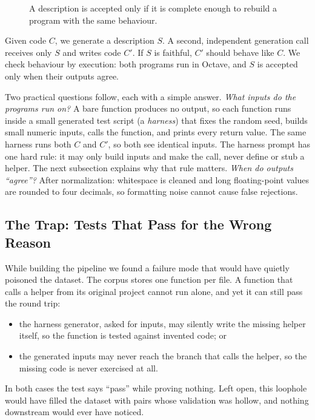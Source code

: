 \documentclass[conference]{IEEEtran}
\begin{document}
\begin{figure}[t]
\centering
{}
\caption{A description is accepted only if it is complete enough to rebuild a program with the same behaviour.}
\label{fig:pipeline-desc}
\end{figure}

Given code $C$, we generate a description $S$. A second, independent generation call receives only $S$ and writes code $C'$. If $S$ is faithful, $C'$ should behave like $C$. We check behaviour by execution: both programs run in Octave, and $S$ is accepted only when their outputs agree.

Two practical questions follow, each with a simple answer. \emph{What inputs do the programs run on?} A bare function produces no output, so each function runs inside a small generated test script (a \emph{harness}) that fixes the random seed, builds small numeric inputs, calls the function, and prints every return value. The same harness runs both $C$ and $C'$, so both see identical inputs. The harness prompt has one hard rule: it may only build inputs and make the call, never define or stub a helper. The next subsection explains why that rule matters. \emph{When do outputs ``agree''?} After normalization: whitespace is cleaned and long floating-point values are rounded to four decimals, so formatting noise cannot cause false rejections.

\subsection{The Trap: Tests That Pass for the Wrong Reason}
\label{sec:resolvability}
While building the pipeline we found a failure mode that would have quietly poisoned the dataset. The corpus stores one function per file. A function that calls a helper from its original project cannot run alone, and yet it can still pass the round trip:
\begin{itemize}
  \item the harness generator, asked for inputs, may silently write the missing helper itself, so the function is tested against invented code; or
  \item the generated inputs may never reach the branch that calls the helper, so the missing code is never exercised at all.
\end{itemize}
In both cases the test says ``pass'' while proving nothing. Left open, this loophole would have filled the dataset with pairs whose validation was hollow, and nothing downstream would ever have noticed.
\end{document}
